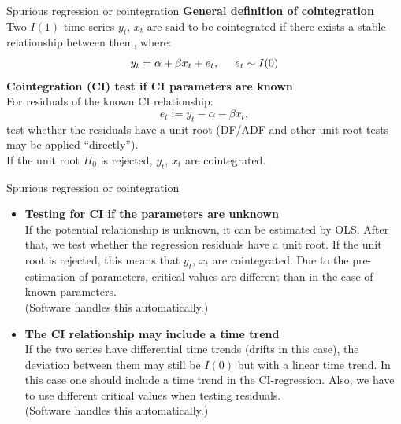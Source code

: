 \documentclass{beamer}
\begin{document}

\begin{frame}{Spurious regression or cointegration}
\textbf{General definition of cointegration}\\
\vspace{0.5cm}
Two $I(1)$-time series $y_t$, $x_t$ are said to be cointegrated if there exists a stable relationship between them, where:
$$ y_t=\alpha+\beta x_t + e_t, 
\hspace{0.5cm} e_t \sim I(0)$$
\textbf{Cointegration (CI) test if CI parameters are known}\\
\vspace{0.5cm}
For residuals of the known CI relationship:
$$e_t := y_t-\alpha-\beta x_t, $$
test whether the residuals have a unit root (DF/ADF and other unit root tests may be applied ``directly''). \\If the unit root $H_0$ is rejected, $y_t$, $x_t$ are cointegrated. 
\end{frame}


\begin{frame}{Spurious regression or cointegration}
\begin{itemize}
\item \textbf{Testing for CI if the parameters are unknown}\\
If the potential relationship is unknown, it can be estimated by OLS. After that, we test whether the regression residuals have a unit root. If the unit root is rejected, this means that $y_t$, $x_t$ are cointegrated. Due to the pre-estimation of parameters, critical values are different than in the case of known parameters. \\(Software handles this automatically.)
\item \textbf{The CI relationship may include a time trend}\\
If the two series have differential time trends (drifts in this case), the deviation between them may still be $I(0)$ but with a linear time trend. In this case one should include a time trend in the CI-regression. Also, we have to use different critical values when testing residuals.
\\(Software handles this automatically.)
\end{itemize}
\end{frame}

\end{document}
